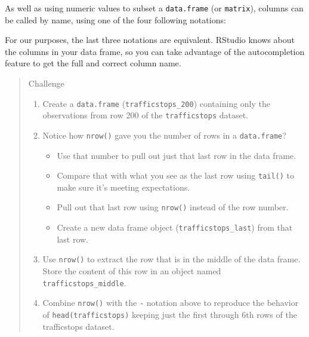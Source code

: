 \documentclass[]{book}
\newenvironment{Shaded}{\begin{snugshade}}{\end{snugshade}}
\newcommand{\StringTok}[1]{\textcolor[rgb]{0.31,0.60,0.02}{#1}}
\newcommand{\CommentTok}[1]{\textcolor[rgb]{0.56,0.35,0.01}{\textit{#1}}}
\newcommand{\OperatorTok}[1]{\textcolor[rgb]{0.81,0.36,0.00}{\textbf{#1}}}
\newcommand{\NormalTok}[1]{#1}
\providecommand{\tightlist}{%
  \setlength{\itemsep}{0pt}\setlength{\parskip}{0pt}}
\theoremstyle{definition}
\theoremstyle{definition}
\theoremstyle{remark}
\begin{document}
As well as using numeric values to subset a \texttt{data.frame} (or
\texttt{matrix}), columns can be called by name, using one of the four
following notations:

\begin{Shaded}
\end{Shaded}

For our purposes, the last three notations are equivalent. RStudio knows
about the columns in your data frame, so you can take advantage of the
autocompletion feature to get the full and correct column name.

\begin{quote}
Challenge

\begin{enumerate}
\def\labelenumi{\arabic{enumi}.}
\item
  Create a \texttt{data.frame} (\texttt{trafficstops\_200}) containing
  only the observations from row 200 of the \texttt{trafficstops}
  dataset.
\item
  Notice how \texttt{nrow()} gave you the number of rows in a
  \texttt{data.frame}?

  \begin{itemize}
  \tightlist
  \item
    Use that number to pull out just that last row in the data frame.
  \item
    Compare that with what you see as the last row using \texttt{tail()}
    to make sure it's meeting expectations.
  \item
    Pull out that last row using \texttt{nrow()} instead of the row
    number.
  \item
    Create a new data frame object (\texttt{trafficstops\_last}) from
    that last row.
  \end{itemize}
\item
  Use \texttt{nrow()} to extract the row that is in the middle of the
  data frame. Store the content of this row in an object named
  \texttt{trafficstops\_middle}.
\item
  Combine \texttt{nrow()} with the \texttt{-} notation above to
  reproduce the behavior of \texttt{head(trafficstops)} keeping just the
  first through 6th rows of the trafficstops dataset.
\end{enumerate}
\end{quote}
\end{document}
